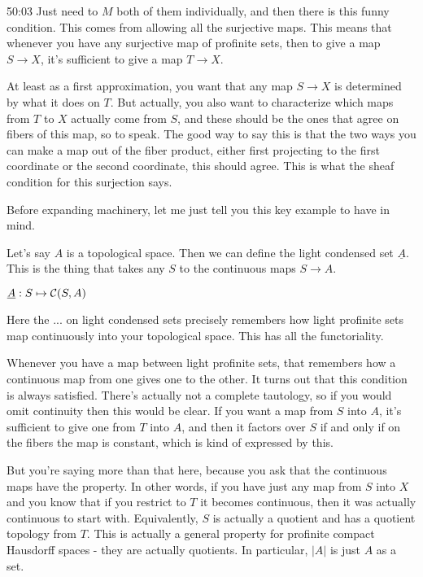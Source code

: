\begin{example}
\begin{unfinished}{50:03}
Just need to $M$ both of them individually, and then there is this funny condition. This comes from allowing all the surjective maps. This means that whenever you have any surjective map of profinite sets, then to give a map $S \to X$, it's sufficient to give a map $T \to X$. 

At least as a first approximation, you want that any map $S \to X$ is determined by what it does on $T$. But actually, you also want to characterize which maps from $T$ to $X$ actually come from $S$, and these should be the ones that agree on fibers of this map, so to speak. The good way to say this is that the two ways you can make a map out of the fiber product, either first projecting to the first coordinate or the second coordinate, this should agree. This is what the sheaf condition for this surjection says.

Before expanding machinery, let me just tell you this key example to have in mind. 

\begin{example}[\yt{1h06m05s}{}] \label{ex:02-}
Let's say $A$ is a topological space. Then we can define the light condensed set $\underline{A}$. This is the thing that takes any $S$ to the continuous maps $S \to A$. 

$ \underline{A}: S \mapsto \mathcal{C}(S, A) $

Here the ...  on light condensed sets precisely remembers how light profinite sets map continuously into your topological space. 
This has all the functoriality.

Whenever you have a map between light profinite sets, that remembers how a continuous map from one gives one to the other. It turns out that this condition is always satisfied. There's actually not a complete tautology, so if you would omit continuity then this would be clear. If you want a map from $S$ into $A$, it's sufficient to give one from $T$ into $A$, and then it factors over $S$ if and only if on the fibers the map is constant, which is kind of expressed by this.

But you're saying more than that here, because you ask that the continuous maps have the property. In other words, if you have just any map from $S$ into $X$ and you know that if you restrict to $T$ it becomes continuous, then it was actually continuous to start with. Equivalently, $S$ is actually a quotient and has a quotient topology from $T$. This is actually a general property for profinite compact Hausdorff spaces - they are actually quotients. In particular, $|A|$ is just $A$ as a set.


\end{example}
\end{unfinished}
\end{example}

